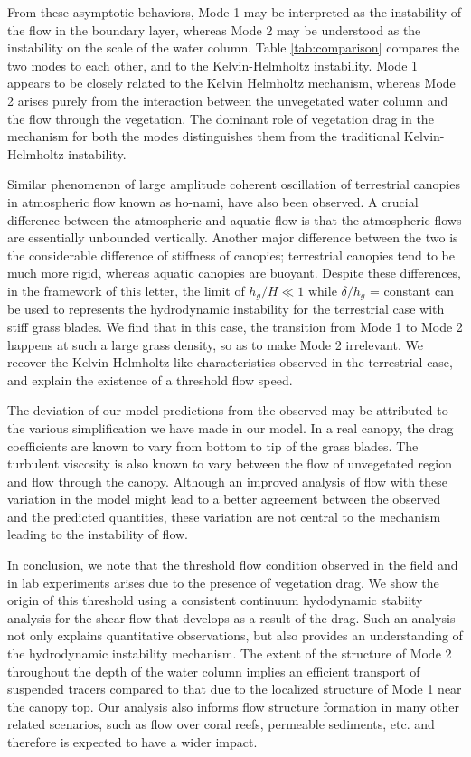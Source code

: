 \documentclass[aps,prl,reprint,twocolumn,showpacs,superscriptaddress,10pt]{revtex4-1}  %
\newcommand{\hg}{h_g}
\begin{document}
From these asymptotic behaviors, Mode 1 may be interpreted as the instability of the flow in the boundary layer, whereas Mode 2 may be understood as the instability on the scale of the water column. Table \ref{tab:comparison} compares the two modes to each other, and to the Kelvin-Helmholtz instability. Mode 1 appears to be closely related to the Kelvin Helmholtz mechanism, whereas Mode 2 arises purely from the interaction between the unvegetated water column and the flow through the vegetation. The dominant role of vegetation drag in the mechanism for both the modes distinguishes them from the traditional Kelvin-Helmholtz instability.

Similar phenomenon of large amplitude coherent oscillation of terrestrial canopies in atmospheric flow known as ho-nami\cite{Inoue56,Raupach96}, have also been observed.
A crucial difference between the atmospheric and aquatic flow is that the atmospheric flows are essentially unbounded vertically\cite{Vivoni98,Nepf00}. 
Another major difference between the two is the considerable difference of stiffness of canopies; terrestrial canopies tend to be much more rigid, whereas aquatic canopies are buoyant\cite{Vivoni98,Ghisal02}. Despite these differences, in the framework of this letter, the limit of $\hg/H \ll 1$ while $\delta/\hg$ = constant can be used to represents the hydrodynamic instability for the terrestrial case with stiff grass blades. We find that in this case, the transition from Mode 1 to Mode 2 happens at such a large grass density, so as to make Mode 2 irrelevant. We recover the Kelvin-Helmholtz-like characteristics observed in the terrestrial case, and explain the existence of a threshold flow speed. 

The deviation of our model predictions from the observed may be attributed to the various simplification we have made in our model. 
In a real canopy, the drag coefficients are known to vary from bottom to tip of the grass blades\cite{Vivoni98,Nepf00}. 
The turbulent viscosity is also known to vary between the flow of unvegetated region and flow through the canopy\cite{Ghisal02}. 
Although an improved analysis of flow with these variation in the model might lead to a better agreement between the observed and the predicted quantities, these variation are not central to the mechanism leading to the instability of flow.

In conclusion, we note that the threshold flow condition observed in the field and in lab experiments arises due to the presence of vegetation drag. We show the origin of this threshold using a consistent continuum hydodynamic stabiity analysis for the shear flow that develops as a result of the drag. Such an analysis not only explains quantitative observations, but also provides an understanding of the hydrodynamic instability mechanism. The extent of the structure of Mode 2 throughout the depth of the water column implies an efficient transport of suspended tracers compared to that due to the localized structure of Mode 1 near the canopy top. 
Our analysis also informs flow structure formation in many other related scenarios, such as flow over coral reefs, permeable sediments, etc. and therefore is expected to have a wider impact.

{}

\end{document}
